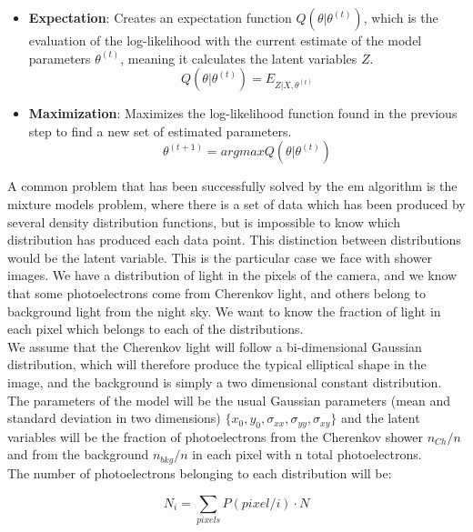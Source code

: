 \documentclass[main.tex]{subfiles}
\begin{document}
\begin{itemize}
\item \textbf{Expectation}: Creates an expectation function $Q(\theta | \theta^{(t)})$, which is the evaluation of the log-likelihood with the current estimate of the model parameters $\theta^{(t)}$, meaning it calculates the latent variables $Z$.
  \begin{equation}
    Q(\theta | \theta^{(t)}) = E_{Z|X,\theta^(t)}
  \end{equation}
   
\item \textbf{Maximization}: Maximizes the log-likelihood function found in the previous step to find a new set of estimated parameters.
  \begin{equation}
    \theta^{(t+1)} = arg max Q(\theta | \theta^{(t)})
  \end{equation}  
\end{itemize}

A common problem that has been successfully solved by the \gls{em} algorithm is the mixture models problem, where there is a set of data which has been produced by several density distribution functions, but is impossible to know which distribution has produced each data point. This distinction between distributions would be the latent variable. This is the particular case we face with shower images. We have a distribution of light in the pixels of the camera, and we know that some photoelectrons come from Cherenkov light, and others belong to background light from the night sky. We want to know the fraction of light in each pixel which belongs to each of the distributions.\\
We assume that the Cherenkov light will follow a bi-dimensional Gaussian distribution, which will therefore produce the typical elliptical shape in the image, and the background is simply a two dimensional constant distribution. The parameters of the model will be the usual Gaussian parameters (mean and standard deviation in two dimensions) $\{x_{0}, y_{0},\sigma_{xx}, \sigma_{yy}, \sigma_{xy}\}$ and the latent variables will be the fraction of photoelectrons from the Cherenkov shower $n_{Ch}/n$ and from the background $n_{bkg}/n$ in each pixel with n total photoelectrons.\\
The number of photoelectrons belonging to each distribution will be:

\begin{equation}
  N_{i} = \sum_{pixels} P(pixel/i)\cdot N
\end{equation}
\end{document}
